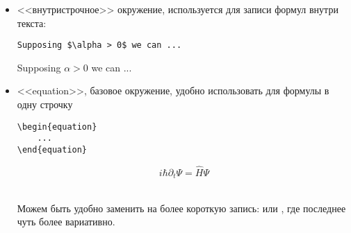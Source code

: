 \begin{itemize}
    \item <<внутристрочное>> окружение, используется для записи формул внутри текста: \\
\begin{minipage}{0.45\textwidth}
    \begin{lstlisting}
Supposing $\alpha > 0$ we can ...
\end{lstlisting}
\end{minipage}
\hfill
\vline
\hfill
\begin{minipage}{0.45\textwidth}
    Supposing $\alpha > 0$ we can ...
\end{minipage}
    \item <<equation>>, базовое окружение, удобно использовать для формулы в одну строчку \\
\begin{minipage}{0.45\textwidth}
    \begin{lstlisting}
\begin{equation}
    ...    
\end{equation}
\end{lstlisting}
\end{minipage}
\hfill
\vline
\hfill
\begin{minipage}{0.45\textwidth}
    \begin{equation}
        i \hbar \partial_t \Psi = \hat{H} \Psi
    \end{equation}
\end{minipage}
\\ Можем быть удобно заменить  на более короткую запись:  или \codeword{\[...\]}, где последнее чуть более вариативно.

\addtocounter{equation}{-1}


\end{itemize}
